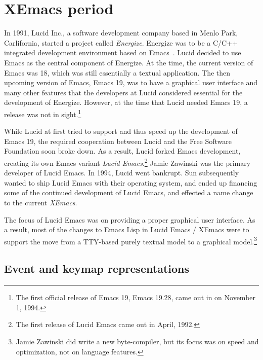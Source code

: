 \documentclass[format=acmsmall, review=false, screen=true]{acmart}
\begin{document}
\section{XEmacs period}         %
\label{sec:xemacs}
  
In 1991, Lucid Inc., a software development company based in Menlo
Park, Carlifornia, started a project called \emph{Energize}.
Energize was to be a C/C++ integrated development environment based on
Emacs~\cite{GabrielLetter}.  Lucid decided to use Emacs as the central
component of Energize.  At the time, the current version of Emacs was
18, which was still essentially a textual application.  The then
upcoming version of Emacs, Emacs 19, was to have a graphical user
interface and many other features that the developers at Lucid
considered essential for the development of Energize.  However, at the
time that Lucid needed Emacs 19, a release was not in
sight.\footnote{The first official release of Emacs 19, Emacs
  19.28, came out in on November 1, 1994.}

While Lucid at first tried to support and thus speed up the
development of Emacs 19, the required cooperation between Lucid and
the Free Software Foundation soon broke down.  As a result, Lucid
forked Emacs development, creating its own Emacs variant \emph{Lucid
Emacs}.\footnote{The first release of Lucid Emacs came out in April,
1992.}  Jamie Zawinski was the primary developer of Lucid Emacs.
In 1994, Lucid went bankrupt.  Sun subsequently wanted to ship
Lucid Emacs with their operating system, and ended up financing some
of the continued development of Lucid Emacs, and effected a name
change to the current \emph{XEmacs}.

The focus of Lucid Emacs was on providing a proper graphical user
interface.  As a result, most of the changes to Emacs Lisp in Lucid
Emacs / XEmacs were to support the move from a TTY-based purely
textual model to a graphical model.\footnote{Jamie Zawinski did write a new
  byte-compiler, but its focus was on speed and optimization, not on
  language features.}

\subsection{Event and keymap representations}
\end{document}
